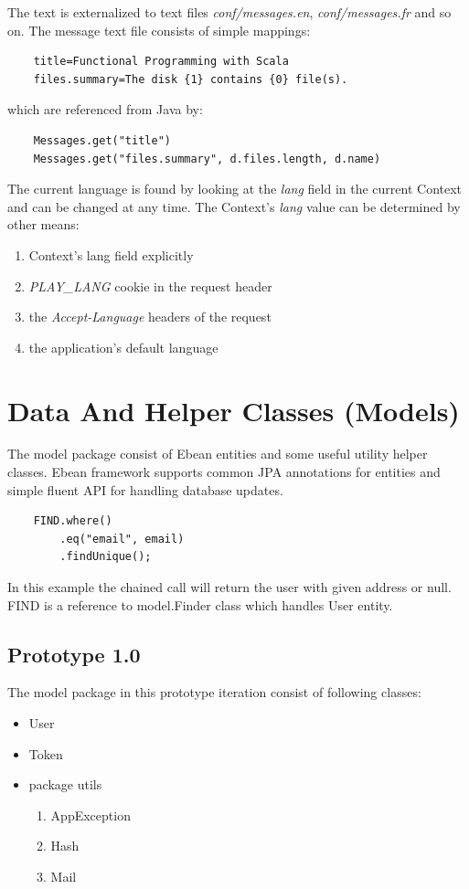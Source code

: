 \documentclass[12pt,twoside,a4paper]{report}
\begin{document}
The text is externalized to text files \emph{conf/messages.en}, \emph{conf/messages.fr} and so on. The message text file consists of simple mappings:
\begin{lstlisting}
	title=Functional Programming with Scala
	files.summary=The disk {1} contains {0} file(s).
\end{lstlisting}
which are referenced from Java by:
\begin{lstlisting}
	Messages.get("title")
	Messages.get("files.summary", d.files.length, d.name)
\end{lstlisting}

The current language is found by looking at the \emph{lang} field in the current Context and can be changed at any time. The Context’s \emph{lang} value can be determined by other means:
\begin{enumerate}\itemsep1pt \parskip0pt 
\item Context’s lang field explicitly
\item \emph{PLAY\_LANG} cookie in the request header
\item the \emph{Accept-Language} headers of the request
\item the application’s default language
\end{enumerate}

\section{Data And Helper Classes (Models)}\label{4.4}
The model package consist of Ebean entities and some useful utility helper classes. Ebean framework supports common JPA annotations for entities and simple fluent API for handling database updates.

\begin{lstlisting}
	FIND.where()
		.eq("email", email)
		.findUnique();
\end{lstlisting}

In this example the chained call will return the user with given address or null. FIND is a reference to model.Finder class which handles User entity.

\subsection{Prototype 1.0}\label{4.4.1}
The model package in this prototype iteration consist of following classes:
\begin{itemize}\itemsep1pt \parskip0pt 
	\item User
	\item Token
	\item package utils
	\begin{enumerate}\itemsep1pt \parskip0pt 
	\item AppException
	\item Hash
	\item Mail
	\end{enumerate}
\end{itemize}
\end{document}
